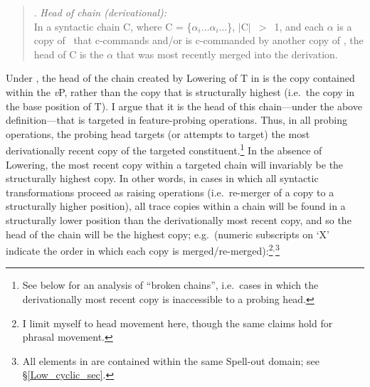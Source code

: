 \begin{samepage}
\singlespacing
\begin{quote}
\ex. {\it Head of chain (derivational):} \label{head_chain_def} \\
In a syntactic chain C, where C = \{$\alpha_{i} \ldots\alpha_{i}\ldots$\}, $\lvert$C$\rvert$~$>$~1, and each $\alpha$ is a copy of \textit{\textbeta}\ that c-commands and/or is c-commanded by another copy of \textit{\textbeta}, the head of C is the $\alpha$ that was most recently merged into the derivation.\footnotemark

\end{quote}

\end{samepage}
\onehalfspacing
\noindent
Under \Last, the head of the chain created by Lowering of T in \LLast is the copy contained within the {\it v}P, rather than the copy that is structurally highest (i.e.\ the copy in the base position of T). I argue that it is the head of this chain---under the above definition---that is targeted in feature-probing operations. Thus, in all probing operations, the probing head targets (or attempts to target) the most derivationally recent copy of the targeted constituent.\footnote{See below for an analysis of ``broken chains'', i.e.\ cases in which the derivationally most recent copy is inaccessible to a probing head.} In the absence of Lowering, the most recent copy within a targeted chain will invariably be the structurally highest copy. In other words, in cases in which all syntactic transformations proceed as raising operations (i.e.\ re-merger of a copy to a structurally higher position), all trace copies within a chain will be found in a structurally lower position than the derivationally most recent copy, and so the head of the chain will be the highest copy; e.g.\ (numeric subscripts on `X' indicate the order in which each copy is merged/re-merged):\footnote{I limit myself to head movement here, though the same claims hold for phrasal movement.}$^{,}$\footnote{All elements in \Next are contained within the same Spell-out domain; see \S\ref{Low_cyclic_sec}.}

